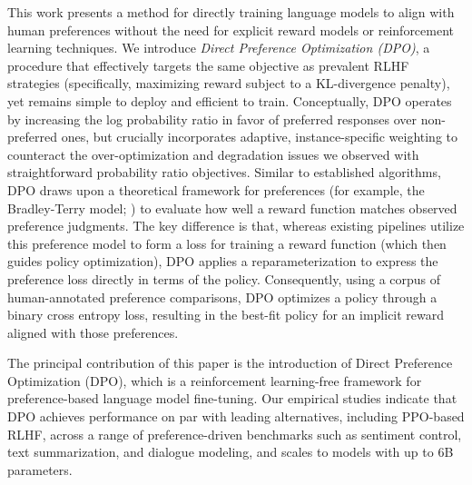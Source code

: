 This work presents a method for directly training language models to align with human preferences without the need for explicit reward models or reinforcement learning techniques. We introduce \textit{{Direct Preference Optimization} (DPO)}, a procedure that effectively targets the same objective as prevalent RLHF strategies (specifically, maximizing reward subject to a KL-divergence penalty), yet remains simple to deploy and efficient to train. Conceptually, DPO operates by increasing the log probability ratio in favor of preferred responses over non-preferred ones, but crucially incorporates adaptive, instance-specific weighting to counteract the over-optimization and degradation issues we observed with straightforward probability ratio objectives. Similar to established algorithms, DPO draws upon a theoretical framework for preferences (for example, the Bradley-Terry model; \cite{bradley1952rankanalysis}) to evaluate how well a reward function matches observed preference judgments. The key difference is that, whereas existing pipelines utilize this preference model to form a loss for training a reward function (which then guides policy optimization), DPO applies a reparameterization to express the preference loss directly in terms of the policy. Consequently, using a corpus of human-annotated preference comparisons, DPO optimizes a policy through a binary cross entropy loss, resulting in the best-fit policy for an implicit reward aligned with those preferences.

The principal contribution of this paper is the introduction of Direct Preference Optimization (DPO), which is a reinforcement learning-free framework for preference-based language model fine-tuning. Our empirical studies indicate that DPO achieves performance on par with leading alternatives, including PPO-based RLHF, across a range of preference-driven benchmarks such as sentiment control, text summarization, and dialogue modeling, and scales to models with up to 6B parameters.

